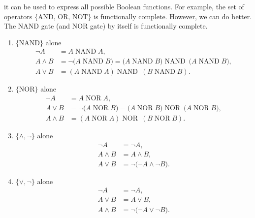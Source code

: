 \newpage 

\begin{Def}

  \label{def:functional_completeness}

 it can be used to express all possible Boolean functions.
    For example, the set of operators $\{\text{AND, OR, NOT}\}$ is functionally complete.
    However, we can do better. The NAND gate (and NOR gate) by itself is functionally complete.
\end{Def}

\begin{Example}

    \begin{enumerate}
  \item $\{\mathrm{NAND}\}$ alone
    \begin{align*}
      \neg A &= A \operatorname{NAND} A,\\
      A\land B &= \neg\bigl(A \operatorname{NAND} B\bigr)
                = \bigl(A \operatorname{NAND} B\bigr)\operatorname{NAND}\ \bigl(A \operatorname{NAND} B\bigr),\\
      A\lor B  &= (A \operatorname{NAND} A)\operatorname{NAND}\ (B \operatorname{NAND} B).
    \end{align*}

  \item $\{\mathrm{NOR}\}$ alone
    \begin{align*}
      \neg A &= A \operatorname{NOR} A,\\
      A\lor B  &= \neg\bigl(A \operatorname{NOR} B\bigr)
                = \bigl(A \operatorname{NOR} B\bigr)\operatorname{NOR}\ \bigl(A \operatorname{NOR} B\bigr),\\
      A\land B &= (A \operatorname{NOR} A)\operatorname{NOR}\ (B \operatorname{NOR} B).
    \end{align*}

    \item $\{\land,\neg\}$ alone
    \begin{align*}
      \neg A   &= \neg A,\\
      A\land B &= A\land B,\\
      A\lor B  &= \neg\bigl(\neg A \land \neg B\bigr).
    \end{align*}

  \item $\{\lor,\neg\}$ alone
    \begin{align*}
      \neg A   &= \neg A,\\
      A\lor B  &= A\lor B,\\
      A\land B &= \neg\bigl(\neg A \lor \neg B\bigr).
    \end{align*}


\end{enumerate}
\end{Example}
